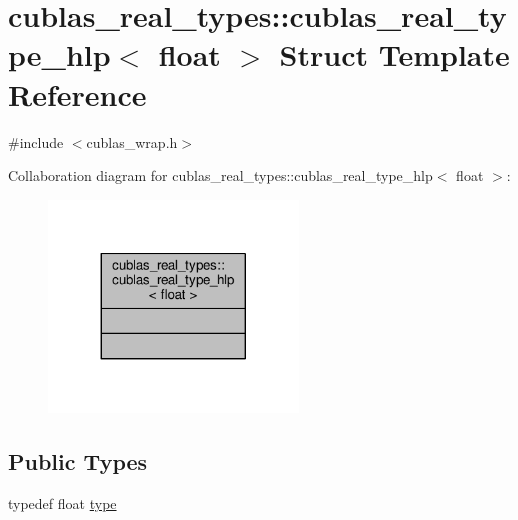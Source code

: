 \hypertarget{structcublas__real__types_1_1cublas__real__type__hlp_3_01float_01_4}{\section{cublas\-\_\-real\-\_\-types\-:\-:cublas\-\_\-real\-\_\-type\-\_\-hlp$<$ float $>$ Struct Template Reference}
\label{structcublas__real__types_1_1cublas__real__type__hlp_3_01float_01_4}
}


{\ttfamily \#include $<$cublas\-\_\-wrap.\-h$>$}



Collaboration diagram for cublas\-\_\-real\-\_\-types\-:\-:cublas\-\_\-real\-\_\-type\-\_\-hlp$<$ float $>$\-:\nopagebreak
\begin{figure}[H]
\begin{center}
\leavevmode
\includegraphics[width=188pt]{structcublas__real__types_1_1cublas__real__type__hlp_3_01float_01_4__coll__graph}
\end{center}
\end{figure}
\subsection*{Public Types}
\begin{DoxyCompactItemize}
\item 
typedef float \hyperlink{structcublas__real__types_1_1cublas__real__type__hlp_3_01float_01_4_a533275b329463dc04ad57764131bda3e}{type}
\end{DoxyCompactItemize}


